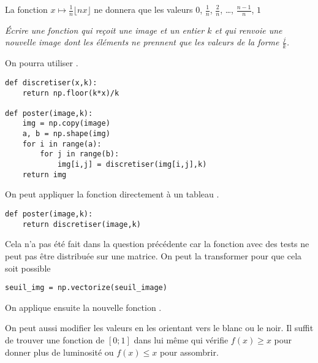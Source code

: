 La fonction $x \mapsto \frac 1n \lfloor nx\rfloor$ ne donnera que les valeurs $0$, $\frac 1n$, $\frac 2n$, \dots, $\frac {n-1}n$, $1$
\begin{Exercise}[title=Image posterisée]\it Écrire une fonction  qui reçoit une image et un entier $k$ et qui renvoie une nouvelle image dont les éléments ne prennent que les valeurs de la forme $\frac jk$.

On pourra utiliser .
\end{Exercise}
\begin{Answer}
\begin{lstlisting}
def discretiser(x,k):
    return np.floor(k*x)/k
    
def poster(image,k):
    img = np.copy(image)
    a, b = np.shape(img)
    for i in range(a):
        for j in range(b):
            img[i,j] = discretiser(img[i,j],k)
    return img
\end{lstlisting}
On peut appliquer la fonction directement à un tableau .

\begin{lstlisting}
def poster(image,k):
    return discretiser(image,k)
\end{lstlisting}

Cela n'a pas été fait dans la question précédente car la fonction avec des tests ne peut pas être distribuée sur une matrice. On peut la transformer pour que cela soit possible 

\begin{lstlisting}
seuil_img = np.vectorize(seuil_image)
\end{lstlisting}

On applique ensuite  la nouvelle fonction .


\end{Answer}
\medskip

On peut aussi modifier les valeurs en les orientant vers le blanc ou le noir. Il suffit de trouver une fonction de $[0;1]$ dans lui même qui vérifie $f(x) \ge x$ pour donner plus de luminosité ou $f(x) \le x$ pour assombrir.

